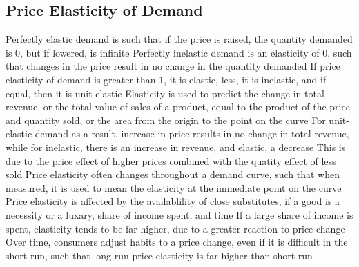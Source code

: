 \documentclass[11 pt, twoside]{article}
\newenvironment{outline*}
{
	\begin{outline}[enumerate]
	}
	{\end{outline}
}
\begin{document}
\subsection{Price Elasticity of Demand}
\begin{outline*}
\1 Perfectly elastic demand is such that if the price is raised, the quantity demanded is 0, but if lowered, is infinite
\2 Perfectly inelastic demand is an elasticity of 0, such that changes in the price result in no change in the quantity demanded
\2 If price elasticity of demand is greater than 1, it is elastic, less, it is inelastic, and if equal, then it is unit-elastic
\1 Elasticity is used to predict the change in total revenue, or the total value of sales of a product, equal to the product of the price and quantity sold, or the area from the origin to the point on the curve
\2 For unit-elastic demand as a result, increase in price results in no change in total revenue, while for inelastic, there is an increase in revenue, and elastic, a decrease
\2 This is due to the price effect of higher prices combined with the quatity effect of less sold
\1 Price elasticity often changes throughout a demand curve, such that when measured, it is used to mean the elasticity at the immediate point on the curve
\1 Price elasticity is affected by the availablility of close substitutes, if a good is a necessity or a luxary, share of income spent, and time
\2 If a large share of income is spent, elasticity tends to be far higher, due to a greater reaction to price change
\2 Over time, consumers adjust habits to a price change, even if it is difficult in the short run, such that long-run price elasticity is far higher than short-run
\end{outline*}
\end{document}
